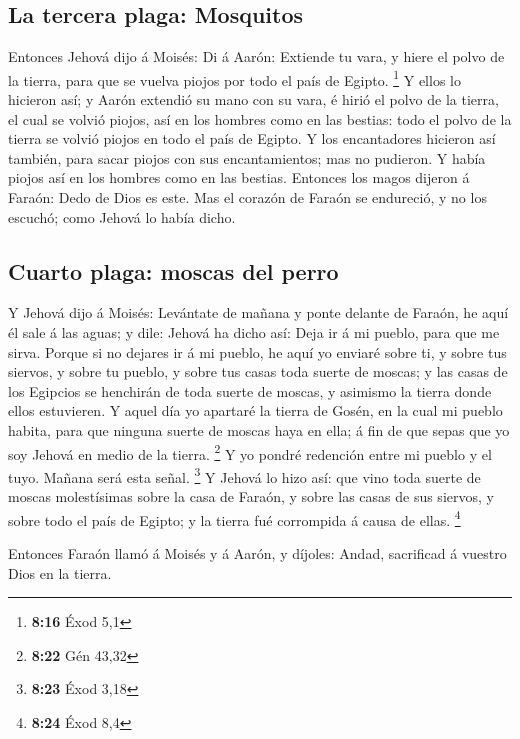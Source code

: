 \hypertarget{la-tercera-plaga-mosquitos}{%
\subsection{La tercera plaga:
Mosquitos}\label{la-tercera-plaga-mosquitos}}

 Entonces Jehová dijo á Moisés: Di á Aarón: Extiende tu
vara, y hiere el polvo de la tierra, para que se vuelva piojos por todo
el país de Egipto. \footnote{\textbf{8:16} Éxod 5,1}  Y
ellos lo hicieron así; y Aarón extendió su mano con su vara, é hirió el
polvo de la tierra, el cual se volvió piojos, así en los hombres como en
las bestias: todo el polvo de la tierra se volvió piojos en todo el país
de Egipto.  Y los encantadores hicieron así también, para
sacar piojos con sus encantamientos; mas no pudieron. Y había piojos así
en los hombres como en las bestias.  Entonces los magos
dijeron á Faraón: Dedo de Dios es este. Mas el corazón de Faraón se
endureció, y no los escuchó; como Jehová lo había dicho.

\hypertarget{cuarto-plaga-moscas-del-perro}{%
\subsection{Cuarto plaga: moscas del
perro}\label{cuarto-plaga-moscas-del-perro}}

 Y Jehová dijo á Moisés: Levántate de mañana y ponte
delante de Faraón, he aquí él sale á las aguas; y dile: Jehová ha dicho
así: Deja ir á mi pueblo, para que me sirva.  Porque si no
dejares ir á mi pueblo, he aquí yo enviaré sobre ti, y sobre tus
siervos, y sobre tu pueblo, y sobre tus casas toda suerte de moscas; y
las casas de los Egipcios se henchirán de toda suerte de moscas, y
asimismo la tierra donde ellos estuvieren.  Y aquel día yo
apartaré la tierra de Gosén, en la cual mi pueblo habita, para que
ninguna suerte de moscas haya en ella; á fin de que sepas que yo soy
Jehová en medio de la tierra. \footnote{\textbf{8:22} Gén 43,32}
 Y yo pondré redención entre mi pueblo y el tuyo. Mañana
será esta señal. \footnote{\textbf{8:23} Éxod 3,18}  Y
Jehová lo hizo así: que vino toda suerte de moscas molestísimas sobre la
casa de Faraón, y sobre las casas de sus siervos, y sobre todo el país
de Egipto; y la tierra fué corrompida á causa de ellas. \footnote{\textbf{8:24}
  Éxod 8,4}

 Entonces Faraón llamó á Moisés y á Aarón, y díjoles:
Andad, sacrificad á vuestro Dios en la tierra.

